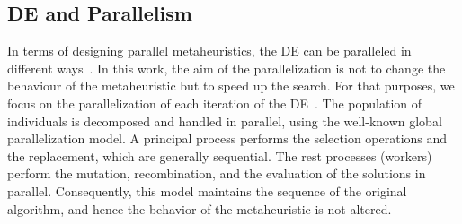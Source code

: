 \subsection{DE and Parallelism} \label{subsec:parallelHDE}
\vspace{-0.2cm}
In terms of designing parallel metaheuristics, the DE can be paralleled in different ways~\cite{Talbi}. %
In this work, the aim of the parallelization is not to change the behaviour of the metaheuristic but to speed up the search. For that purposes, we focus on the parallelization of each iteration of the DE~\cite{albaPEA2006}. The population of individuals is decomposed and handled in parallel, using the well-known global parallelization model. A principal process performs the selection operations and the replacement, which are generally sequential. The rest processes (workers) perform the mutation, recombination, and the evaluation of the solutions in parallel. Consequently, this model maintains the sequence of the original algorithm, and hence the behavior of the metaheuristic is not altered. 










